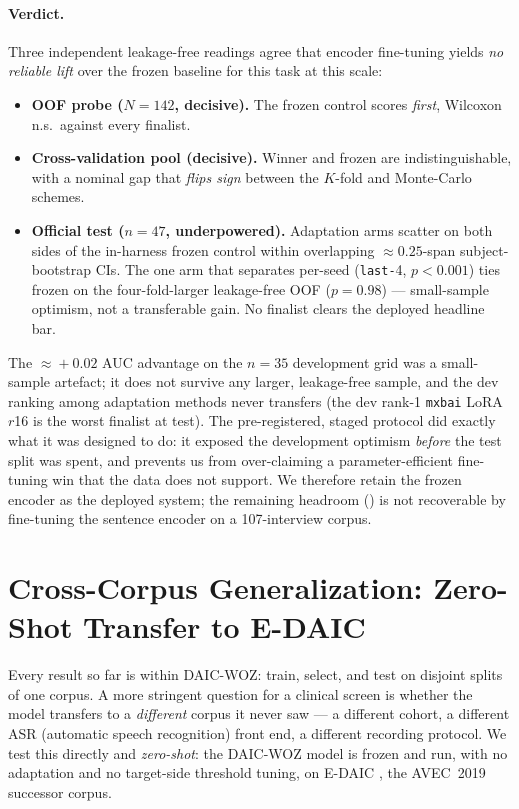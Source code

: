 \documentclass[conference]{IEEEtran}
\begin{document}
\paragraph{Verdict.} Three independent leakage-free readings agree that encoder
fine-tuning yields \emph{no reliable lift} over the frozen baseline for this task at
this scale:
\begin{itemize}
  \item \textbf{OOF probe ($N\!=\!142$, decisive).} The frozen control scores
        \emph{first}, Wilcoxon n.s.\ against every finalist.
  \item \textbf{Cross-validation pool (decisive).} Winner and frozen are
        indistinguishable, with a nominal gap that \emph{flips sign} between the
        $K$-fold and Monte-Carlo schemes.
  \item \textbf{Official test ($n\!=\!47$, underpowered).} Adaptation arms scatter
        on both sides of the in-harness frozen control within overlapping
        $\approx\!0.25$-span subject-bootstrap CIs. The one arm that separates
        per-seed (\texttt{last-}4, $p<0.001$) ties frozen on the four-fold-larger
        leakage-free OOF ($p=0.98$) --- small-sample optimism, not a transferable
        gain. No finalist clears the deployed headline bar.
\end{itemize}
The $\approx\!+0.02$ AUC advantage on the $n\!=\!35$ development grid was a
small-sample artefact; it does not survive any larger, leakage-free sample, and the
dev ranking among adaptation methods never transfers (the dev rank-1 \texttt{mxbai}
LoRA $r$16 is the worst finalist at test). The pre-registered, staged protocol did
exactly what it was designed to do: it exposed the development optimism \emph{before}
the test split was spent, and prevents us from over-claiming a parameter-efficient
fine-tuning win that the data does not support. We therefore retain the frozen
encoder as the deployed system; the remaining headroom () is not
recoverable by fine-tuning the sentence encoder on a 107-interview corpus.
\fi
\section{Cross-Corpus Generalization: Zero-Shot Transfer to E-DAIC}
\label{sec:edaic}

Every result so far is within DAIC-WOZ: train, select, and test on disjoint
splits of one corpus. A more stringent question for a clinical screen is whether the
model transfers to a \emph{different} corpus it never saw --- a different cohort,
a different ASR (automatic speech recognition) front end, a different recording protocol. We test this directly
and \emph{zero-shot}: the DAIC-WOZ model is frozen and run, with no adaptation
and no target-side threshold tuning, on E-DAIC \cite{ringeval2019avec}, the
AVEC~2019 successor corpus.
\end{document}
